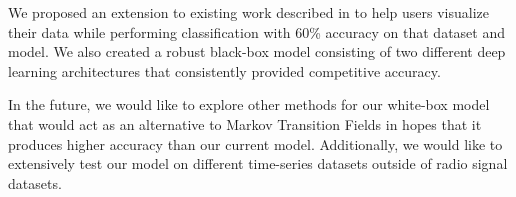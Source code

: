\documentclass{turabian-thesis}
\begin{document}
We proposed an extension to existing work described in \cite{wang_encoding_nodate} to help users visualize their data while performing classification  with 60\% accuracy on that dataset and model. We also created a robust black-box model consisting of two different deep learning architectures that consistently provided competitive accuracy.

In the future, we would like to explore other methods for our white-box model that would act as an alternative to Markov Transition Fields in hopes that it produces higher accuracy than our current model. Additionally, we would like to extensively test our model on different time-series datasets outside of radio signal datasets.



 
\end{document}

